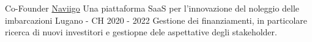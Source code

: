 
\begin{cventries}
  \cventry
    {Co-Founder} %
    {\href{https://www.naviigo.com}{Naviigo}} %
    {Una piattaforma SaaS per l'innovazione del noleggio delle imbarcazioni}
    {Lugano - CH} %
    {2020 -  2022} %
    {
      Gestione dei finanziamenti, in particolare ricerca di nuovi investitori e gestiopne dele aspettative degli stakeholder.
    }
\end{cventries}